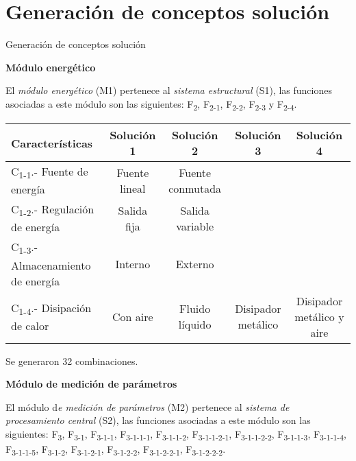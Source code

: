 \section{Generaci\'on de conceptos soluci\'on}
\label{Generacion_conceptos_solucion}

Generaci\'on de conceptos soluci\'on
\par

\textbf{M\'odulo energ\'etico}

El \textit{m\'odulo energ\'etico} (M1) pertenece al \textit{sistema estructural} (S1), las funciones asociadas a este m\'odulo son las siguientes: F\textsubscript{2}, F\textsubscript{2-1}, F\textsubscript{2-2}, F\textsubscript{2-3} y F\textsubscript{2-4}.

\begin{center}
\begin{adjustbox}{angle=90}
\begin{tabular}{|l|c|c|c|c|}
\hline
\textbf{Caracter\'isticas} &
 \textbf{Soluci\'on 1} &
 \textbf{Soluci\'on 2} &
 \textbf{Soluci\'on 3} &
 \textbf{Soluci\'on 4}\\\hline
C\textsubscript{1-1}.- Fuente de energ\'ia &
 Fuente lineal &
 Fuente conmutada &
   &
 \\\hline
C\textsubscript{1-2}.- Regulaci\'on de energ\'ia &
 Salida fija &
 Salida variable &
   &
 \\\hline
C\textsubscript{1-3}.- Almacenamiento de energ\'ia &
 Interno &
 Externo\newline &
   &
 \\\hline
C\textsubscript{1-4}.- Disipaci\'on de calor &
 Con aire &
 Fluido l\'iquido &
 Disipador met\'alico &
 Disipador met\'alico y aire\\\hline
\end{tabular}
\end{adjustbox}
\end{center}

\par Se generaron 32 combinaciones.


\textbf{M\'odulo de medici\'on de par\'ametros}

El m\'odulo d\textit{e medici\'on de par\'ametros} (M2) pertenece al \textit{sistema de procesamiento central} (S2), las funciones asociadas a este m\'odulo son las siguientes: F\textsubscript{3}, F\textsubscript{3-1}, F\textsubscript{3-1-1}, F\textsubscript{3-1-1-1}, F\textsubscript{3-1-1-2}, F\textsubscript{3-1-1-2-1}, F\textsubscript{3-1-1-2-2}, F\textsubscript{3-1-1-3}, F\textsubscript{3-1-1-4}, F\textsubscript{3-1-1-5}, F\textsubscript{3-1-2}, F\textsubscript{3-1-2-1}, F\textsubscript{3-1-2-2}, F\textsubscript{3-1-2-2-1}, F\textsubscript{3-1-2-2-2}.

